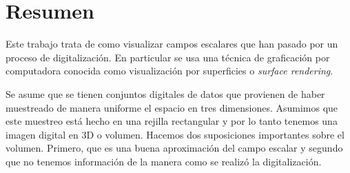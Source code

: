 \chapter*{Resumen}
Este trabajo trata de como visualizar campos escalares que han pasado por un proceso de digitalización. En particular se usa una técnica de graficación por computadora conocida como visualización por superficies o \emph{surface rendering}.

Se asume que se tienen conjuntos digitales de datos que provienen de haber muestreado de manera uniforme el espacio en tres dimensiones. Asumimos que este muestreo está hecho en una rejilla rectangular y por lo tanto tenemos una imagen digital en 3D o volumen. Hacemos dos suposiciones importantes sobre el volumen. Primero, que es una buena aproximación del campo escalar y segundo que no tenemos información de la manera como se realizó la digitalización.
